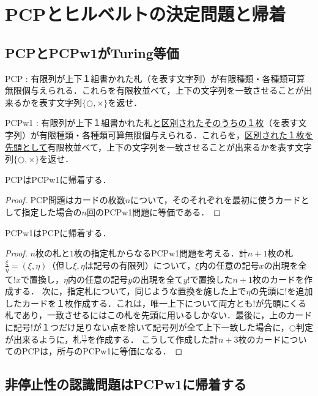 \documentclass[uplatex, 12pt, dvipdfmx]{jsreport}
\begin{document}
\section{PCPとヒルベルトの決定問題と帰着}

\subsection{PCPとPCPw1がTuring等価}
\begin{screen}
    PCP : 有限列が上下１組書かれた札（を表す文字列）が有限種類・各種類可算無限個与えられる．これらを有限枚並べて，上下の文字列を一致させることが出来るかを表す文字列$\{\bigcirc,\times\}$を返せ．

    PCPw1 : 有限列が上下１組書かれた札\underline{と区別されたそのうちの１枚}（を表す文字列）が有限種類・各種類可算無限個与えられる．これらを，\underline{区別された１枚を先頭として}有限枚並べて，上下の文字列を一致させることが出来るかを表す文字列$\{\bigcirc,\times\}$を返せ．
\end{screen}

\begin{proposition}
    PCPはPCPw1に帰着する．
\end{proposition}
\begin{proof}
    PCP問題はカードの枚数$n$について，そのそれぞれを最初に使うカードとして指定した場合の$n$回のPCPw1問題に等価である．
\end{proof}

\begin{proposition}
    PCPw1はPCPに帰着する．
\end{proposition}
\begin{proof}
    $n$枚の札と$1$枚の指定札からなるPCPw1問題を考える．計$n+1$枚の札$\frac{\xi}{\eta}=(\xi,\eta)$（但し$\xi,\eta$は記号の有限列）について，$\xi$内の任意の記号$x$の出現を全て$!x$で置換し，$\eta$内の任意の記号$y$の出現を全て$y!$で置換した$n+1$枚のカードを作成する．
    次に，指定札について，同じような置換を施した上で$\eta$の先頭に$!$を追加したカードを１枚作成する．これは，唯一上下について両方とも$!$が先頭にくる札であり，一致させるにはこの札を先頭に用いるしかない．最後に，上のカードに記号$!$が１つだけ足りない点を除いて記号列が全て上下一致した場合に，$\bigcirc$判定が出来るように，札$\frac{!?}{?}$を作成する．
    こうして作成した計$n+3$枚のカードについてのPCPは，所与のPCPw1に等価になる．
\end{proof}

\subsection{非停止性の認識問題はPCPw1に帰着する}
\end{document}
